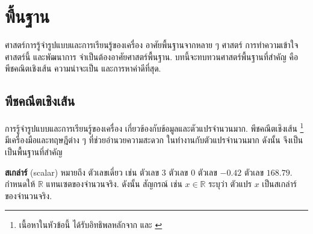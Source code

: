 \chapter{พื้นฐาน}
\label{chapter: background}

\begin{Parallel}[c]{0.54\textwidth}{0.4\textwidth}
\end{Parallel}
\vspace{0.5cm}

ศาสตร์การรู้จำรูปแบบและการเรียนรู้ของเครื่อง อาศัยพื้นฐานจากหลาย ๆ ศาสตร์
การทำความเข้าใจศาสตร์นี้
และพัฒนาการ
จำเป็นต้องอาศัยศาสตร์พื้นฐาน.
บทนี้จะทบทวนศาสตร์พื้นฐานที่สำคัญ คือ พีชคณิตเชิงเส้น ความน่าจะเป็น และการหาค่าดีที่สุด.

\section{พีชคณีตเชิงเส้น}
\label{sec: linear algebra}


การรู้จำรูปแบบและการเรียนรู้ของเครื่อง เกี่ยวข้องกับข้อมูลและตัวแปรจำนวนมาก.
พีชคณีตเชิงเส้น%
\footnote{%
เนื้อหาในหัวข้อนี้ ได้รับอิทธิพลหลักจาก
\cite{GoodfellowEtAl2016}
\cite{ChongZak2ndEd}
และ
\cite{Strang2016}
}
มีเครื่องมือและทฤษฎีต่าง ๆ 
ที่ช่วยอำนวยความสะดวก
ในทำงานกับตัวแปรจำนวนมาก
ดังนั้น จึงเป็นเป็นพื้นฐานที่สำคัญ

\textbf{สเกล่าร์} (scalar) 
หมายถึง ตัวเลขเดี่ยว เช่น ตัวเลข $3$ ตัวเลข $0$ ตัวเลข $-0.42$ ตัวเลข $168.79$.
กำหนดให้ $\mathbb{R}$ แทนเซตของจำนวนจริง.
ดังนั้น สัญกรณ์ เช่น $x \in \mathbb{R}$ ระบุว่า ตัวแปร $x$ เป็นสเกล่าร์ของจำนวนจริง.

